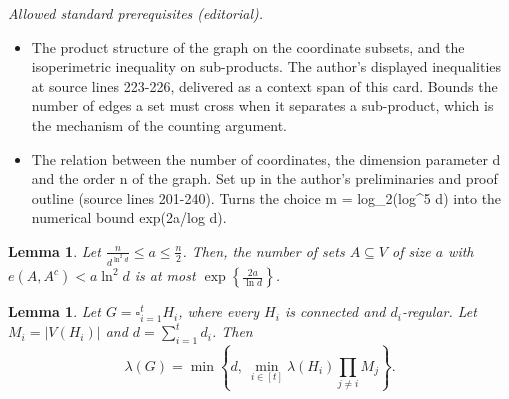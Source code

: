 \documentclass[10pt,a4paper]{amsart}
\newtheorem{lemma}[thm]{Lemma}
\begin{document}
\noindent\textit{Allowed standard prerequisites (editorial).}\begin{itemize}
\item The product structure of the graph on the coordinate subsets, and the isoperimetric inequality on sub-products. The author's displayed inequalities at source lines 223-226, delivered as a context span of this card. Bounds the number of edges a set must cross when it separates a sub-product, which is the mechanism of the counting argument.
\item The relation between the number of coordinates, the dimension parameter d and the order n of the graph. Set up in the author's preliminaries and proof outline (source lines 201-240). Turns the choice m = log\_2(log\textasciicircum{}5 d) into the numerical bound exp(2a/log d).
\end{itemize}\medskip
\begin{lemma}\label{lem:small-boundary-sets}
Let $\frac{n}{d^{\ln^2 d}}\le a\le \frac{n}{2}$. Then, the number of sets $A\subseteq V$ of size $a$ with $e(A,A^c)< a\ln^2d$ is at most $\exp\left\{\frac{2a}{\ln d}\right\}$.
\end{lemma}

\begin{lemma}\label{lem:product-connectivity}
Let $G=\square_{i=1}^t H_i$, where every $H_i$ is connected and $d_i$-regular.
Let $M_i=|V(H_i)|$ and $d=\sum_{i=1}^t d_i$.
Then
\[
  \lambda(G)=
  \min\left\{d,\ \min_{i\in[t]}\lambda(H_i)\prod_{j\ne i}M_j\right\}.
\]
\end{lemma}
\end{document}
